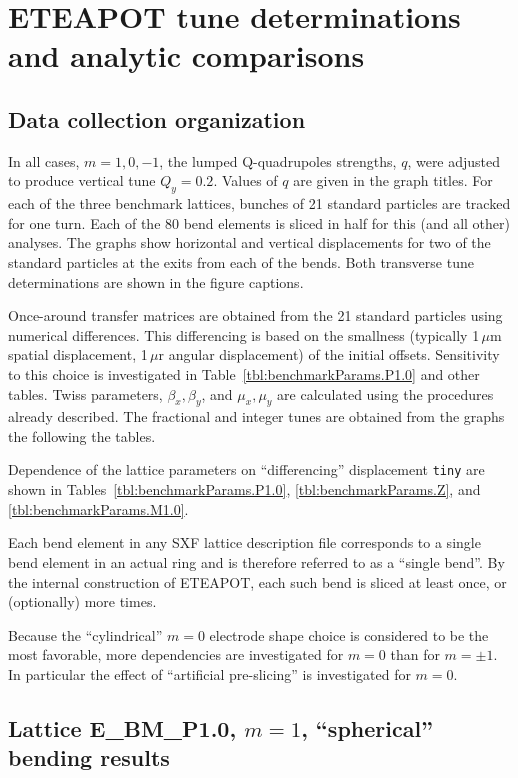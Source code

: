 \documentclass[12pt]{article}
\begin{document}
\section{ETEAPOT tune determinations and analytic comparisons}
\subsection{Data collection organization}
In all cases, $m=1,0,-1$, the lumped Q-quadrupoles strengths, $q$, were adjusted to produce vertical
tune $Q_y=0.2$. Values of $q$ are given in the graph titles.
For each of the three benchmark lattices, bunches of 21 standard particles are 
tracked for one turn. Each of the 80 bend elements is sliced in half for this (and all other) analyses. 
The graphs show horizontal and vertical displacements for two of the standard particles at the exits from 
each of the bends. Both transverse tune determinations are shown in the figure captions. 

Once-around transfer matrices are obtained from the 21 standard particles using numerical differences. 
This differencing is based on the smallness (typically 1\,$\mu$m spatial displacement, 1\,$\mu$r 
angular displacement) of the initial offsets. Sensitivity to this choice is investigated in 
Table~\ref{tbl:benchmarkParams.P1.0} and other tables. Twiss parameters, $\beta_x, \beta_y$, and 
$\mu_x, \mu_y$ are calculated using the procedures already described. The fractional and integer tunes 
are obtained from the graphs the following the tables.

Dependence of the lattice parameters on ``differencing'' displacement {\tt tiny} are shown in 
Tables~\ref{tbl:benchmarkParams.P1.0}, \ref{tbl:benchmarkParams.Z}, and \ref{tbl:benchmarkParams.M1.0}.

Each bend element in any SXF lattice description file corresponds to a single bend element in
an actual ring and is therefore referred to as a ``single bend''. By the internal construction of ETEAPOT, 
each such bend is sliced at least once, or (optionally) more times. 

Because the ``cylindrical'' $m=0$ electrode shape choice is considered to be the most favorable,
more dependencies are investigated for $m=0$ than for $m=\pm1$. In particular the effect of 
``artificial pre-slicing'' is investigated for $m=0$.

\clearpage

\subsection{Lattice E\_BM\_P1.0, $m=1$, ``spherical'' bending results}
\end{document}
